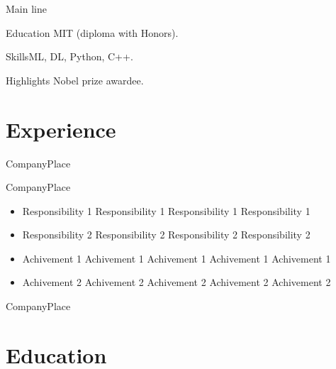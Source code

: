 \documentclass[letterpaper, 10pt, yearbullet]{techcv}
\author{Surname}{Name}{N.}
\begin{document}
\maketitle

\begin{paracol}{2}

\begin{summary}
\item{Main line}
    {\lipsum[66]}

\item{Education}
	{MIT (diploma with Honors).}

\item{Skills}{ML, DL, Python, C++.}

\item{Highlights}
	{Nobel prize awardee.}
\end{summary}


\section{Experience}

\begin{joblist}
	{Company}{Place}
    {\lipsum[66]}

	{Company}{Place}
    {%
	\begin{itemize}
		\item Responsibility 1 Responsibility 1 Responsibility 1 Responsibility 1
		\item Responsibility 2 Responsibility 2 Responsibility 2 Responsibility 2
		\item Achivement 1 Achivement 1 Achivement 1 Achivement 1 Achivement 1
		\item Achivement 2 Achivement 2 Achivement 2 Achivement 2 Achivement 2
	\end{itemize}%
	}

	{Company}{Place}
    {\lipsum[75]}

\end{joblist}


\section{Education}
\begin{joblist}
	

\end{joblist}
\end{paracol}
\end{document}
